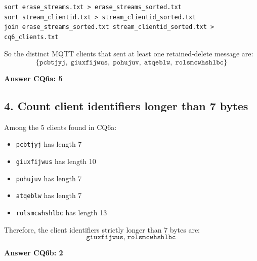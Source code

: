 \begin{lstlisting}
sort erase_streams.txt > erase_streams_sorted.txt
sort stream_clientid.txt > stream_clientid_sorted.txt
join erase_streams_sorted.txt stream_clientid_sorted.txt > cq6_clients.txt
\end{lstlisting}

So the distinct MQTT clients that sent at least one retained-delete message are:
\[
\{\texttt{pcbtjyj},\; \texttt{giuxfijwus},\; \texttt{pohujuv},\; \texttt{atqeblw},\; \texttt{rolsmcwhshlbc}\}
\]

\textbf{\huge Answer CQ6a: 5}

\subsection*{4. Count client identifiers longer than 7 bytes}

Among the 5 clients found in CQ6a:
\begin{itemize}
    \item \texttt{pcbtjyj} has length 7
    \item \texttt{giuxfijwus} has length 10
    \item \texttt{pohujuv} has length 7
    \item \texttt{atqeblw} has length 7
    \item \texttt{rolsmcwhshlbc} has length 13
\end{itemize}

Therefore, the client identifiers strictly longer than 7 bytes are:
\[
\texttt{giuxfijwus},\; \texttt{rolsmcwhshlbc}
\]

\textbf{\huge Answer CQ6b: 2}